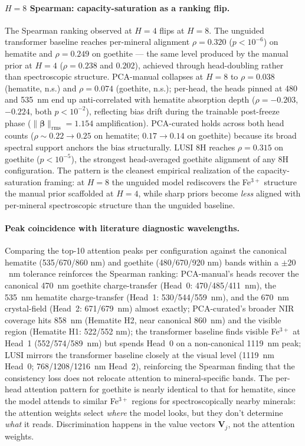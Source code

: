 \documentclass[preprint,12pt]{elsarticle}
\begin{document}
\paragraph{$H = 8$ Spearman: capacity-saturation as a ranking flip.}
The Spearman ranking observed at $H = 4$ flips at $H = 8$. The unguided transformer baseline reaches per-mineral alignment $\rho = 0.320$ ($p < 10^{-6}$) on hematite and $\rho = 0.249$ on goethite --- the same level produced by the manual prior at $H = 4$ ($\rho = 0.238$ and $0.202$), achieved through head-doubling rather than spectroscopic structure. PCA-manual collapses at $H = 8$ to $\rho = 0.038$ (hematite, n.s.) and $\rho = 0.074$ (goethite, n.s.); per-head, the heads pinned at 480 and 535~nm end up anti-correlated with hematite absorption depth ($\rho = -0.203$, $-0.224$, both $p < 10^{-2}$), reflecting bias drift during the trainable post-freeze phase ($\|\bm{\beta}\|_{\text{rms}} = 1.154$ amplification). PCA-curated holds across both head counts ($\rho \sim 0.22 \to 0.25$ on hematite; $0.17 \to 0.14$ on goethite) because its broad spectral support anchors the bias structurally. LUSI 8H reaches $\rho = 0.315$ on goethite ($p < 10^{-5}$), the strongest head-averaged goethite alignment of any 8H configuration. The pattern is the cleanest empirical realization of the capacity-saturation framing: at $H = 8$ the unguided model rediscovers the Fe$^{3+}$ structure the manual prior scaffolded at $H = 4$, while sharp priors become \emph{less} aligned with per-mineral spectroscopic structure than the unguided baseline.

\paragraph{Peak coincidence with literature diagnostic wavelengths.}
Comparing the top-10 attention peaks per configuration against the canonical hematite (535/670/860 nm) and goethite (480/670/920 nm) bands within a $\pm 20$~nm tolerance reinforces the Spearman ranking: PCA-manual's heads recover the canonical 470~nm goethite charge-transfer (Head~0: 470/485/411~nm), the 535~nm hematite charge-transfer (Head~1: 530/544/559~nm), and the 670~nm crystal-field (Head~2: 671/679~nm) almost exactly; PCA-curated's broader NIR coverage hits 858~nm (Hematite H2, near canonical 860~nm) and the visible region (Hematite H1: 522/552 nm); the transformer baseline finds visible Fe$^{3+}$ at Head~1 (552/574/589~nm) but spends Head~0 on a non-canonical 1119~nm peak; LUSI mirrors the transformer baseline closely at the visual level (1119~nm Head~0; 768/1208/1216~nm Head~2), reinforcing the Spearman finding that the consistency loss does not relocate attention to mineral-specific bands. The per-head attention pattern for goethite is nearly identical to that for hematite, since the model attends to similar Fe$^{3+}$ regions for spectroscopically nearby minerals: the attention weights select \emph{where} the model looks, but they don't determine \emph{what} it reads. Discrimination happens in the value vectors $\mathbf{V}_j$, not the attention weights.
\end{document}
